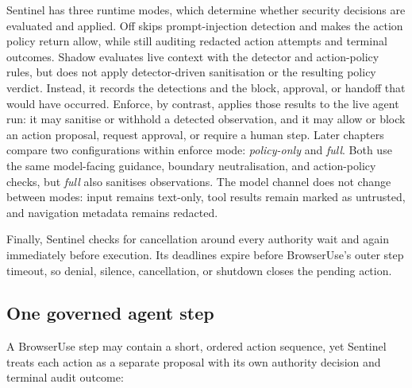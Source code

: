 Sentinel has three runtime modes, which determine whether security decisions are
evaluated and applied. Off skips prompt-injection detection and makes the action
policy return allow, while still auditing redacted action attempts and terminal
outcomes. Shadow evaluates live context with the detector and action-policy
rules, but does not apply detector-driven sanitisation or the resulting policy
verdict. Instead, it records the detections and the block, approval, or handoff
that would have occurred. Enforce, by contrast, applies those results to the
live agent run: it may sanitise or withhold a detected observation, and it may
allow or block an action proposal, request approval, or require a human step.
Later chapters compare two
configurations within enforce mode: \emph{policy-only} and \emph{full}. Both use
the same model-facing guidance, boundary neutralisation, and action-policy
checks, but \emph{full} also sanitises observations. The model channel does not
change between modes: input remains text-only, tool results remain marked as
untrusted, and navigation metadata remains redacted.

Finally, Sentinel checks for cancellation around every authority wait and again
immediately before execution. Its deadlines expire before BrowserUse's outer
step timeout, so denial, silence, cancellation, or shutdown closes the pending
action.

\subsection{One governed agent step}

A BrowserUse step may contain a short, ordered action sequence, yet Sentinel
treats each action as a separate proposal with its own authority decision and
terminal audit outcome:

